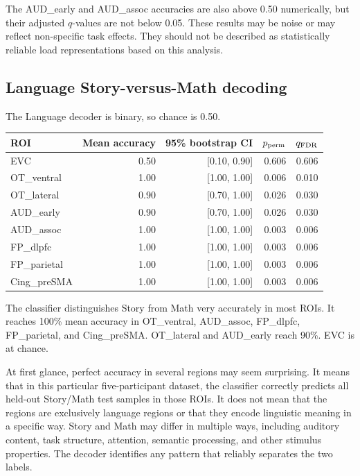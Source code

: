 \documentclass[11pt,a4paper]{article}
\begin{document}
The AUD\_early and AUD\_assoc accuracies are also above 0.50 numerically, but their adjusted \(q\)-values are not below 0.05. These results may be noise or may reflect non-specific task effects. They should not be described as statistically reliable load representations based on this analysis.

\subsection{Language Story-versus-Math decoding}

The Language decoder is binary, so chance is 0.50.

\begin{center}
\begin{tabular}{lrrrr}
\toprule
\textbf{ROI} & \textbf{Mean accuracy} & \textbf{95\% bootstrap CI} & \textbf{\(p_{\rm perm}\)} & \textbf{\(q_{\rm FDR}\)}\\
\midrule
EVC & 0.50 & [0.10, 0.90] & 0.606 & 0.606\\
OT\_ventral & 1.00 & [1.00, 1.00] & 0.006 & 0.010\\
OT\_lateral & 0.90 & [0.70, 1.00] & 0.026 & 0.030\\
AUD\_early & 0.90 & [0.70, 1.00] & 0.026 & 0.030\\
AUD\_assoc & 1.00 & [1.00, 1.00] & 0.003 & 0.006\\
FP\_dlpfc & 1.00 & [1.00, 1.00] & 0.003 & 0.006\\
FP\_parietal & 1.00 & [1.00, 1.00] & 0.003 & 0.006\\
Cing\_preSMA & 1.00 & [1.00, 1.00] & 0.003 & 0.006\\
\bottomrule
\end{tabular}
\end{center}

The classifier distinguishes Story from Math very accurately in most ROIs. It reaches 100\% mean accuracy in OT\_ventral, AUD\_assoc, FP\_dlpfc, FP\_parietal, and Cing\_preSMA. OT\_lateral and AUD\_early reach 90\%. EVC is at chance.

At first glance, perfect accuracy in several regions may seem surprising. It means that in this particular five-participant dataset, the classifier correctly predicts all held-out Story/Math test samples in those ROIs. It does not mean that the regions are exclusively language regions or that they encode linguistic meaning in a specific way. Story and Math may differ in multiple ways, including auditory content, task structure, attention, semantic processing, and other stimulus properties. The decoder identifies any pattern that reliably separates the two labels.
\end{document}
